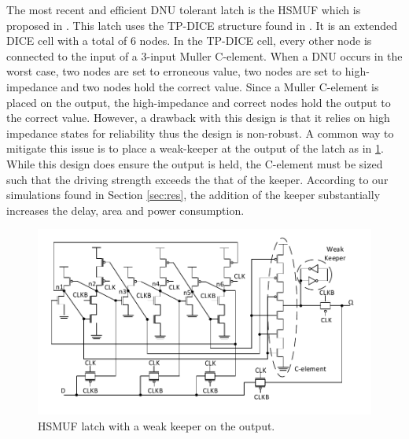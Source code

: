The most recent and efficient DNU tolerant latch is the HSMUF which is proposed in \cite{HSMUF}. This latch uses the TP-DICE structure found in \cite{TPDICE}. It is an extended DICE cell with a total of 6 nodes. In the TP-DICE cell, every other node is connected to the input of a 3-input Muller C-element. When a DNU occurs in the worst case, two nodes are set to erroneous value, two nodes are set to high-impedance and two nodes hold the correct value. Since a Muller C-element is placed on the output, the high-impedance and correct nodes hold the output to the correct value. However, a drawback with this design is that it relies on high impedance states for reliability thus the design is non-robust. A common way to mitigate this issue is to place a weak-keeper at the output of the latch as in \ref{HSMUF_fig}. While this design does ensure the output is held, the C-element must be sized such that the driving strength exceeds the that of the keeper. According to our simulations found in Section \ref{sec:res}, the addition of the keeper substantially increases the delay, area and power consumption. 

\begin{figure}[!htbp]
\centering
\includegraphics[width=\linewidth]{Figures/HSMUF}
\caption{HSMUF latch \cite{HSMUF} with a weak keeper on the output.}
\label{HSMUF_fig}
\end{figure}
 
